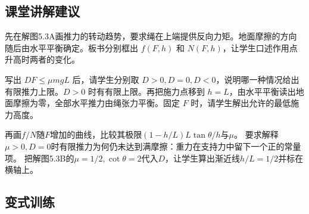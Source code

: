 \documentclass[UTF8,fontset=fandol,a4paper,11pt]{ctexart}
\begin{document}

\subsection*{课堂讲解建议}

先在解图5.3A画推力的转动趋势，要求绳在上端提供反向力矩。地面摩擦的方向随后由水平平衡确定。板书分别框出 $f(F,h)$ 和 $N(F,h)$，让学生口述作用点升高时两者的变化。

写出 $DF\le\mu mgL$ 后，请学生分别取 $D>0,D=0,D<0$，说明哪一种情况给出有限推力上限。$D>0$ 时有有限上限。再把施力点移到 $h=L$，由水平平衡读出地面摩擦为零，全部水平推力由绳张力平衡。固定 $F$ 时，请学生解出允许的最低施力高度。

再画$f/N$随$F$增加的曲线，比较其极限$(1-h/L)L\tan\theta/h$与$\mu$。
要求解释$\mu>0,D=0$时有限推力为何仍未达到满摩擦：重力在支持力中留下一个正的常量项。
把解图5.3B的$\mu=1/2,\cot\theta=2$代入$D$，让学生算出渐近线$h/L=1/2$并标在横轴上。



\subsection*{变式训练}
\end{document}
